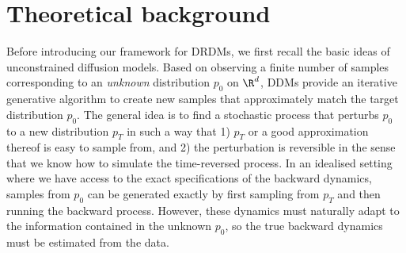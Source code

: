 \documentclass[a4paper, 11pt, headings = small, abstract]{scrartcl}
\begin{document}
\section{Theoretical background}\label{sec:setting}
Before introducing our framework for DRDMs, we first recall the basic ideas of unconstrained diffusion models. 
Based on observing a finite number of samples corresponding to an \textit{unknown} distribution $p_0$ on $\R^d$, DDMs provide an iterative generative algorithm to create new samples that approximately match the target distribution $p_0$. The general idea is to find a stochastic process that perturbs $p_0$ to a new distribution $p_T$ in such a way that 1) $p_T$ or a good approximation thereof is easy to sample from, and 2) the perturbation is reversible in the sense that we know how to simulate the time-reversed process. In an idealised setting where we have access to the exact specifications of the backward dynamics, samples from $p_0$ can be generated exactly by first sampling from $p_T$ and then running the backward process. However, these dynamics must naturally adapt to the information contained in the unknown $p_0$, so the true backward dynamics must be estimated from the data. 
\end{document}
